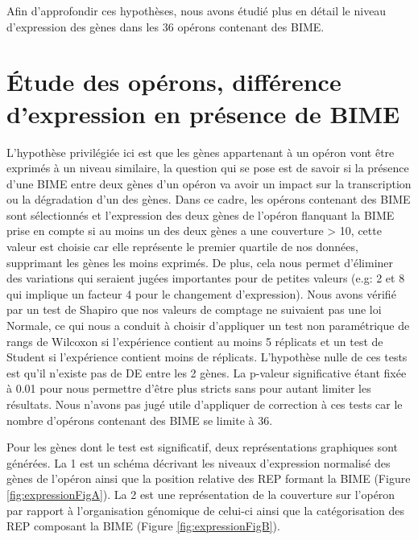 \documentclass[12pt,a4paper]{report}
\begin{document}
\begin{onehalfspace}
Afin d'approfondir ces hypothèses, nous avons étudié plus en détail le niveau d'expression des gènes dans les 36 opérons contenant des BIME.

\section*{Étude des opérons, différence d'expression en présence de BIME}
\label{expression_operon}
L'hypothèse privilégiée ici est que les gènes appartenant à un opéron vont être exprimés à un niveau similaire, la question qui se pose est de savoir si la présence d'une BIME entre deux gènes d'un opéron va avoir un impact sur la transcription ou la dégradation d'un des gènes. Dans ce cadre, les opérons contenant des BIME sont sélectionnés et l'expression des deux gènes de l'opéron flanquant la BIME prise en compte si au moins un des deux gènes a une couverture > 10, cette valeur est choisie car elle représente le premier quartile de nos données, supprimant les gènes les moins exprimés. De plus, cela nous permet d'éliminer des variations qui seraient jugées importantes pour de petites valeurs (e.g: 2 et 8 qui implique un facteur 4 pour le changement d'expression). Nous avons vérifié par un test de Shapiro que nos valeurs de comptage ne suivaient pas une loi Normale, ce qui nous a conduit à choisir d'appliquer un test non paramétrique de rangs de Wilcoxon si l'expérience contient au moins 5 réplicats et un test de Student si l'expérience contient moins de réplicats. L'hypothèse nulle de ces tests est qu'il n'existe pas de DE entre les 2 gènes. La p-valeur significative étant fixée à 0.01 pour nous permettre d'être plus stricts sans pour autant limiter les résultats. Nous n'avons pas jugé utile d'appliquer de correction à ces tests car le nombre d'opérons contenant des BIME se limite à 36.

Pour les gènes dont le test est significatif, deux représentations graphiques sont générées. La 1 est un schéma décrivant les niveaux d'expression normalisé des gènes de l'opéron ainsi que la position relative des REP formant la BIME (Figure \autoref{fig:expressionFigA}). La 2 est une représentation de la couverture sur l'opéron par rapport à l'organisation génomique de celui-ci ainsi que la catégorisation des REP composant la BIME (Figure \autoref{fig:expressionFigB}).


\end{onehalfspace}
\end{document}
